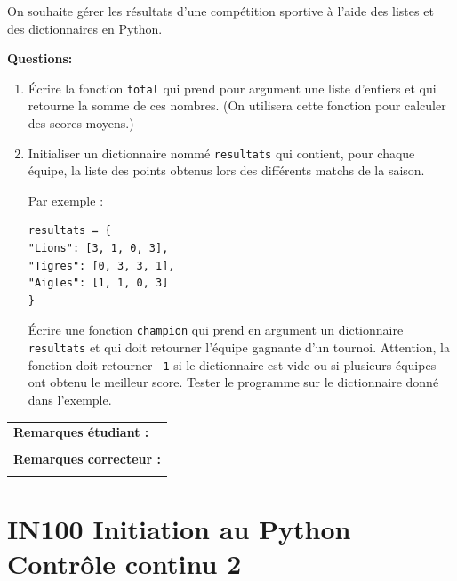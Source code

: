 \documentclass[a4paper,11pt]{article}
\begin{document}
On souhaite gérer les résultats d’une compétition sportive à l’aide des listes et des dictionnaires en Python.

\vspace{0.2 cm}
\textbf{Questions:}

\begin{enumerate}
\item Écrire la fonction \texttt{total} qui prend pour argument une liste d’entiers et qui retourne la somme de ces nombres.
(On utilisera cette fonction pour calculer des scores moyens.)

\item Initialiser un dictionnaire nommé \texttt{resultats} qui contient, pour chaque équipe, la liste des points obtenus lors des différents matchs de la saison.

Par exemple :
\begin{verbatim}
resultats = {
"Lions": [3, 1, 0, 3],
"Tigres": [0, 3, 3, 1],
"Aigles": [1, 1, 0, 3]
}
\end{verbatim}


 Écrire une fonction \texttt{champion} qui prend en argument un dictionnaire \texttt{resultats} et qui doit retourner l'équipe gagnante d'un tournoi. 
Attention, la fonction doit retourner \texttt{-1} si le dictionnaire est vide ou si plusieurs équipes ont obtenu le meilleur score.  Tester le programme sur le dictionnaire donné dans l'exemple. 
\end{enumerate}


\vspace{0.2 cm}

\begin{table}[h!]
\centering
\renewcommand{\arraystretch}{1.4} %
\begin{tabular}{|p{15cm}|}
\hline
\textbf{Remarques étudiant :}    \\
 \\
\hline
\textbf{Remarques correcteur :}  \\
 \\
\hline
\end{tabular}
\end{table}


\newpage

\section*{\center IN100 Initiation au Python\\
Contrôle continu 2}
\end{document}
